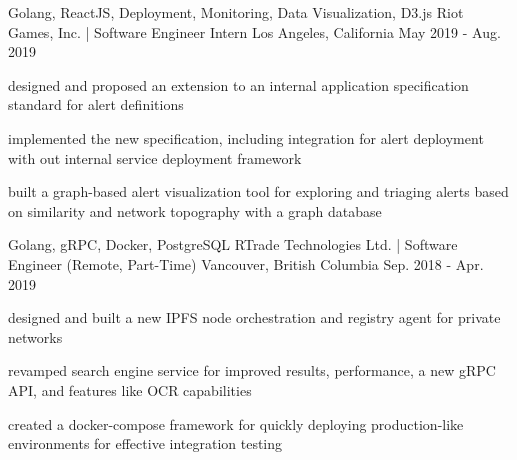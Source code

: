 

\begin{cventries}

  \cventry
    {Golang, ReactJS, Deployment, Monitoring, Data Visualization, D3.js} %
    {Riot Games, Inc. | Software Engineer Intern} %
    {Los Angeles, California} %
    {May 2019 - Aug. 2019} %
    {
      \begin{cvitems} %
        \item {designed and proposed an extension to an internal application specification standard for alert definitions}
        \item{implemented the new specification, including integration for alert deployment with out internal service deployment framework}
        \item {built a graph-based alert visualization tool for exploring and triaging alerts based on similarity and network topography with a graph database}
      \end{cvitems}
    }

  \cventry
    {Golang, gRPC, Docker, PostgreSQL} %
    {RTrade Technologies Ltd. | Software Engineer (Remote, Part-Time)} %
    {Vancouver, British Columbia} %
    {Sep. 2018 - Apr. 2019} %
    {
      \begin{cvitems} %
        \item {designed and built a new IPFS node orchestration and registry agent for private networks}
        \item {revamped search engine service for improved results, performance, a new gRPC API, and features like OCR capabilities}
        \item {created a docker-compose framework for quickly deploying production-like environments for effective integration testing}
      \end{cvitems}
    }


\end{cventries}
